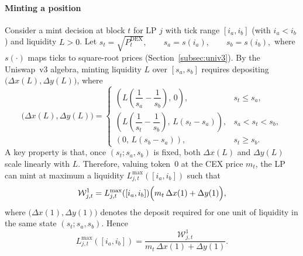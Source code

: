 \documentclass[11pt]{article}
\begin{document}
\paragraph{Minting a position}
Consider a mint decision at block $t$ for LP $j$ with tick range $[i_a,i_b]$ (with $i_a<i_b$) and liquidity
$L>0$. Let
$
  s_t = \sqrt{P^{\mathrm{DEX}}_t},\qquad s_a=s(i_a),\qquad s_b=s(i_b),
$
where $s(\cdot)$ maps ticks to square-root prices (Section~\ref{subsec:univ3}). By the Uniswap~v3 algebra,
minting liquidity $L$ over $[s_a,s_b]$ requires depositing
$\bigl(\Delta x(L),\Delta y(L)\bigr)$, where
\begin{equation}
  \bigl(\Delta x(L),\Delta y(L)\bigr)
  =
  \begin{cases}
    \left(L\!\left(\dfrac{1}{s_a}-\dfrac{1}{s_b}\right),\,0\right), & s_t \le s_a,\\[1.0ex]
    \left(L\!\left(\dfrac{1}{s_t}-\dfrac{1}{s_b}\right),\,L(s_t-s_a)\right), & s_a < s_t < s_b,\\[1.0ex]
    \left(0,\,L(s_b-s_a)\right), & s_t \ge s_b.
  \end{cases}
  \label{eq:lp-mint-deposits}
\end{equation}
A key property is that, once $(s_t;s_a,s_b)$ is fixed, both $\Delta x(L)$ and $\Delta y(L)$ scale
linearly with $L$. Therefore, valuing token~0 at the CEX price $m_t$, the LP can
mint at maximum a liquidity $L^{\max}_{j,t}([i_a,i_b])$ such that
\begin{equation}
  \mathcal{W}^1_{j,t}
  =
  L^{\max}_{j,t}([i_a,i_b])\Bigl(m_t\,\Delta x(1) + \Delta y(1)\Bigr),
  \label{eq:lp-Lmax}
\end{equation}
where $\bigl(\Delta x(1),\Delta y(1)\bigr)$ denotes the deposit required for one unit of liquidity
in the same state $(s_t;s_a,s_b)$. Hence
\begin{equation}
  L^{\max}_{j,t}([i_a,i_b])
  =
  \frac{\mathcal{W}^1_{j,t}}{m_t\,\Delta x(1) + \Delta y(1)}.
  \label{eq:lp-Lmax-cash}
\end{equation}
\end{document}
